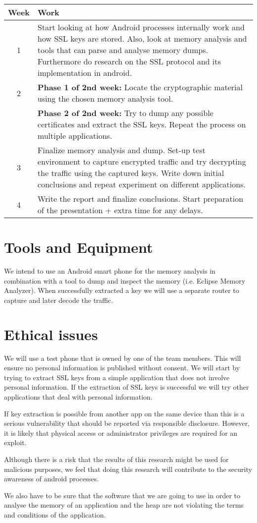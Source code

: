 \documentclass[11pt]{article}
\begin{document}
\begin{center}
\begin{tabular}{ | c | m{11cm}|  } 
\hline
Week & Work \\ 
\hline
1 & Start looking at how Android processes internally work and how SSL keys are stored. Also, look at memory analysis and tools that can parse and analyse memory dumps. Furthermore do research on the SSL protocol and its implementation in android. \\ 
\hline
2 & \textbf{Phase 1 of 2nd week:} Locate the cryptographic material using the chosen memory analysis tool.\\
& \textbf{Phase 2 of 2nd week:} Try to dump any possible certificates and extract the SSL keys. Repeat the process on multiple applications.\\ 
\hline
3 & Finalize memory analysis and dump. Set-up test environment to capture encrypted traffic and try decrypting the traffic using the captured keys. Write down initial conclusions and repeat experiment on different applications.  \\ 
\hline
4 & Write the report and finalize conclusions. Start preparation of the presentation + extra time for any delays. \\
\hline
\end{tabular}
\end{center}

\clearpage

\section{Tools and Equipment}
We intend to use an Android smart phone for the memory analysis in combination with a tool to dump and inspect the memory (i.e. Eclipse Memory Analyzer). When successfully extracted a key we will use a separate router to capture and later decode the traffic. 

\section{Ethical issues}
We will use a test phone that is owned by one of the team members. This will ensure no personal information is published without consent. We will start by trying to extract SSL keys from a simple application that does not involve personal information. If the extraction of SSL keys is successful we will try other applications that deal with personal information. 

If key extraction is possible from another app on the same device than this is a serious vulnerability that should be reported via responsible disclosure. However, it is likely that physical access or administrator privileges are required for an exploit.

Although there is a risk that the results of this research might be used for malicious purposes, we feel that doing this research will contribute to the security awareness of android processes.

We also have to be sure that the software that we are going to use in order to analyse the memory of an application and the heap are not violating the terms and conditions of the application. 



\end{document}
